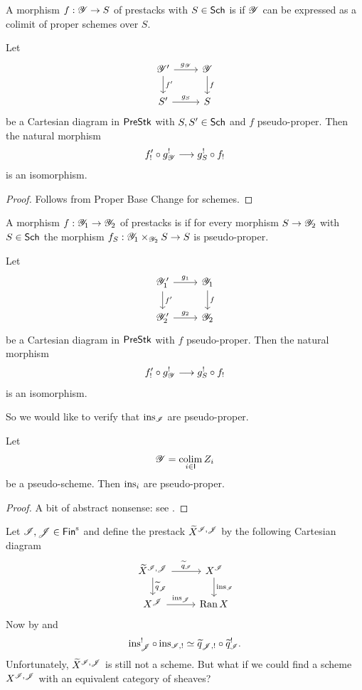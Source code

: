 \documentclass[oneside]{amsart}
\begin{document}
\begin{definition}
	A morphism $f:\CY\to S$ of prestacks with $S\in \mathsf{Sch}$ is  if $\mathscr{Y}$ can be expressed as a colimit of proper schemes over $S$.
\end{definition}
\begin{proposition}
	Let
	\[
	\begin{tikzcd}
		\CY' \ar[r,"g_\CY"] \ar[d,"f'"] & \CY \ar[d,"f"] \\
		S' \ar[r,"g_S"] & S
	\end{tikzcd}
	\] 
	be a Cartesian diagram in $\mathsf{PreStk}$ with $S,S'\in \mathsf{Sch}$ and $f$ pseudo-proper. Then the natural morphism
	\[
	f'_!\circ g_\CY^{!} \to g_S^{!} \circ f_!
	\] 
	is an isomorphism.
\end{proposition}
\begin{proof}
	Follows from Proper Base Change for schemes.
\end{proof}
\begin{definition}
	A morphism $f:\CY_1\to \CY_2$ of prestacks is  if for every morphism $S\to \CY_2$ with $S\in \mathsf{Sch}$ the morphism $f_S:\CY_1\times_{\CY_2}S\to S$ is pseudo-proper.
\end{definition}
\begin{corollary}\label{cor:bc}
	Let
	\[
	\begin{tikzcd}
		\CY_1' \ar[r,"g_1"] \ar[d,"f'"] & \CY_1 \ar[d,"f"] \\
		\CY_2' \ar[r,"g_2"] & \CY_2
	\end{tikzcd}
	\] 
	be a Cartesian diagram in $\mathsf{PreStk}$ with $f$ pseudo-proper. Then the natural morphism
	\[
	f'_!\circ g_\CY^{!} \to g_S^{!} \circ f_!
	\] 
	is an isomorphism.
\end{corollary}

So we would like to verify that $\operatorname{ins}_{\mathscr{I}}$ are pseudo-proper.
\begin{proposition}\label{prop:insp}
	Let
	\[
		\mathscr{Y} = \operatorname*{colim}_{i\in \mathsf{I}}Z_i
	\] 
	be a pseudo-scheme. Then $\operatorname{ins}_i$ are pseudo-proper.
\end{proposition}
\begin{proof}
	A bit of abstract nonsense: see \cite[Proposition~7.4.2]{abott}.
\end{proof}

Let $\CI,\CJ\in \Fins$ and define the prestack $\widetilde{X}^{\mathscr{I},\mathscr{J}}$ by the following Cartesian diagram
\[
\begin{tikzcd}
	\wt{X}^{\CI,\CJ} \ar[r,"\wt{q}_{\CI}"] \ar[d,"\wt{q}_{\CJ}"] & X^{\CI} \ar[d,"\ins_{\CI}"] \\
	X^{\CJ} \ar[r,"\ins_{\CJ}"] & \Ran X
\end{tikzcd}
\] 
Now by  and 
\[
	\operatorname{ins}_{\mathscr{J}}^{!}\circ\operatorname{ins}_{\mathscr{I},!} \simeq \widetilde{q}_{\mathscr{J},!}\circ \widetilde{q}_{\mathscr{I}}^{!}.
\] 
Unfortunately, $\widetilde{X}^{\mathscr{I},\mathscr{J}}$ is still not a scheme. But what if we could find a scheme $X^{\mathscr{I},\mathscr{J}}$ with an equivalent category of sheaves?
\end{document}
